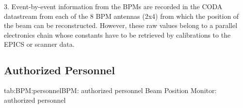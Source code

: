 3. Event-by-event information from the BPMs are recorded in the CODA datastream
from each of the 8 BPM antennas (2x4) from which the position of the beam can be 
reconstructed. However, these raw values belong to a parallel electronics chain 
whose constants have to be retrieved by calibrations to the EPICS or scanner 
data. 

\begin{safetyen}{10}{10}
\subsection{ Authorized Personnel}
\end{safetyen}

\begin{namestab}{tab:BPM:personnel}{BPM: authorized personnel}{%
   Beam Position Monitor: authorized personnel}
\end{namestab}


